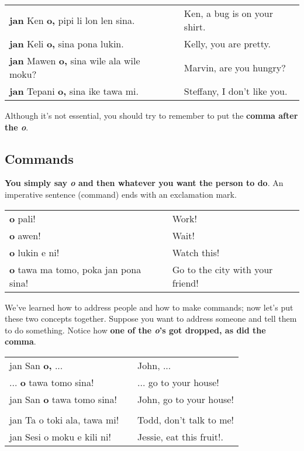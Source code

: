 \begin{supertabular}{p{5,5cm}|ll}
\textbf{jan} Ken \textbf{o,} pipi li lon len sina. && Ken, a bug is on your shirt. \\
\textbf{jan} Keli \textbf{o,} sina pona lukin. && Kelly, you are pretty. \\
\textbf{jan} Mawen \textbf{o,} sina wile ala wile moku? && Marvin, are you hungry? \\
\textbf{jan} Tepani \textbf{o,} sina ike tawa mi. && Steffany, I don't like you. \\
\end{supertabular} 

Although it's not essential, you should try to remember to put the \textbf{comma after the \textit{o}}. 

%
\subsection*{Commands}
%
\textbf{You simply say \textit{o} and then whatever you want the person to do}. 
An imperative sentence (command) ends with an exclamation mark.

\begin{supertabular}{p{5,5cm}|ll}
\textbf{o} pali! && Work! \\
\textbf{o} awen! && Wait! \\
\textbf{o} lukin e ni! && Watch this! \\
\textbf{o} tawa ma tomo, poka jan pona sina! && Go to the city with your friend! \\
\end{supertabular} 

We've learned how to address people and how to make commands; now let's put these two concepts together. 
Suppose you want to address someone and tell them to do something. 
Notice how \textbf{one of the \textit{o}'s got dropped, as did the comma}. 

\begin{supertabular}{p{5,5cm}|ll}
jan San \textbf{o,} ...  && John, ... \\
 ... \textbf{o} tawa tomo sina! && ... go to your house! \\
jan San \textbf{o} tawa tomo sina!  && John, go to your house! \\
 && \\ %
jan Ta o toki ala, tawa mi! && Todd, don't talk to me! \\
jan Sesi o moku e kili ni! && Jessie, eat this fruit!. \\
\end{supertabular} 

